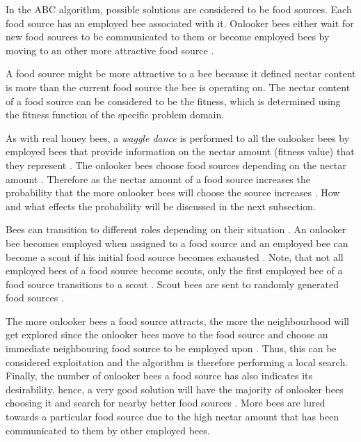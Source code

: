In the ABC algorithm, possible solutions are considered to be food sources\cite{ABCCompareStudy,ABCNumericalOptimization}. Each food source has an employed bee associated with it. Onlooker bees either wait for new food sources to be communicated to them or become employed bees by moving to an other more attractive food source \cite{ABCCompareStudy,ABCNumericalOptimization}. 

A food source might be more attractive to a bee because it defined nectar content is more than the current food source the bee is operating on\cite{ABCCompareStudy,ABCNumericalOptimization}. The nectar content of a food source can be considered to be the fitness, which is determined using the fitness function of the specific problem domain\cite{ABCCompareStudy,ABCNumericalOptimization}.

As with real honey bees, a \emph{waggle dance} is performed to all the onlooker bees by employed bees that provide information on the nectar amount (fitness value) that they represent \cite{ABCReconfigDistro,ABCCompareStudy,ABCImageEnhancement}. The onlooker bees choose food sources depending on the nectar amount \cite{ABCReconfigDistro,ABCCompareStudy,ABCImageEnhancement}. Therefore as the nectar amount of a food source increases the probability that the more onlooker bees will choose the source increases \cite{ABCReconfigDistro,ABCCompareStudy,ABCImageEnhancement}. How and what effects the probability will be discussed in the next subsection.

Bees can transition to different roles depending on their situation \cite{ABCCompareStudy,ABCNumericalOptimization}. An onlooker bee becomes employed when assigned to a food source and an employed bee can become a scout if his initial food source becomes exhausted \cite{ABCImageEnhancement,ABCCompareStudy,ABCReconfigDistro}. Note, that not all employed bees of a food source become scouts, only the first employed bee of a food source transitions to a scout \cite{ABCImageEnhancement,ABCCompareStudy,ABCReconfigDistro}. Scout bees are sent to randomly generated food sources \cite{ABCImageEnhancement,ABCCompareStudy,ABCReconfigDistro}. 

The more onlooker bees a food source attracts, the more the neighbourhood will get explored since the onlooker bees move to the food source and choose an immediate neighbouring food source to be employed upon \cite{ABCCompareStudy,ABCNumericalOptimization}. Thus, this can be considered exploitation and the algorithm is therefore performing a local search\cite{ABCCompareStudy,ABCReconfigDistro,ABCNumericalOptimization}. Finally, the number of onlooker bees a food source has also indicates its desirability, hence, a very good solution will have the majority of onlooker bees choosing it and search for nearby better food sources \cite{ABCCompareStudy,ABCReconfigDistro,ABCNumericalOptimization}. More bees are lured towards a particular food source due to the high nectar amount that has been communicated to them by other employed bees\cite{ABCCompareStudy,ABCReconfigDistro,ABCNumericalOptimization}.

